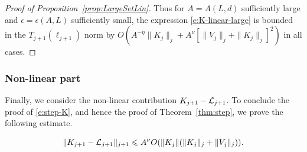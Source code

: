 \documentclass[11pt]{amsart}
\numberwithin{equation}{section}
\numberwithin{theorem}{section}
\newcommand{\1}{{\bf 1}}
\begin{document}
\begin{proof}[Proof of Proposition~\ref{prop:LargeSetLin}]
Thus for $A=A(L,d)$ sufficiently large and $\epsilon=\epsilon(A,L)$
sufficiently small, the expression \eqref{e:K-linear-large} is bounded
in the $T_{j+1}(\ell_{j+1})$ norm by $
O(A^{-\eta}\|K_j\|_j+A^\nu[\|V_j\|_j + \|K_j\|_j]^{2})$ in all cases.
\end{proof}
\subsubsection{Non-linear part}
\label{sec:K-nonlinear}

Finally, we consider the non-linear contribution $K_{j+1}-\mathcal L_{j+1}$.
To conclude the proof of \eqref{e:step-K}, and hence the proof of
Theorem~\ref{thm:step}, we prove the following estimate.

\begin{proposition} \label{prop:K-linear-nonlinear}
\begin{equation}
\|K_{j+1}-\mathcal L_{j+1}\|_{j+1}\leqslant A^\nu O(\|K_j\|(\|K_j\|_j+\|V_j\|_j)).
\end{equation}
\end{proposition}
\end{document}

